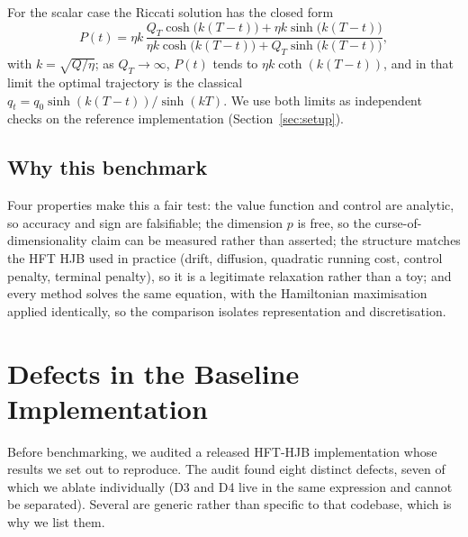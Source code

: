 \documentclass[conference]{IEEEtran}
\begin{document}
For the scalar case the Riccati solution has the closed form
\begin{equation}
P(t) = \eta k\,\frac{Q_T\cosh\!\big(k(T{-}t)\big) + \eta k\sinh\!\big(k(T{-}t)\big)}
{\eta k\cosh\!\big(k(T{-}t)\big) + Q_T\sinh\!\big(k(T{-}t)\big)},
\end{equation}
with $k=\sqrt{Q/\eta}$; as $Q_T \to \infty$, $P(t)$ tends to $\eta k\coth(k(T-t))$, and in that
limit the optimal trajectory is the classical
$q_t = q_0\sinh(k(T-t))/\sinh(kT)$. We use both limits as independent checks on the
reference implementation (Section~\ref{sec:setup}).

\subsection{Why this benchmark}
Four properties make this a fair test: the value function and control are analytic, so accuracy
and sign are falsifiable; the dimension $p$ is free, so the curse-of-dimensionality claim can be
measured rather than asserted; the structure matches the HFT HJB used in practice (drift,
diffusion, quadratic running cost, control penalty, terminal penalty), so it is a legitimate
relaxation rather than a toy; and every method solves the same equation, with the Hamiltonian
maximisation applied identically, so the comparison isolates representation and discretisation.

\section{Defects in the Baseline Implementation}\label{sec:defects}

Before benchmarking, we audited a released HFT-HJB implementation whose results we set out to
reproduce. The audit found eight distinct defects, seven of which we ablate individually (D3
and D4 live in the same expression and cannot be separated). Several are generic rather than
specific to that codebase, which is why we list them.
\end{document}
